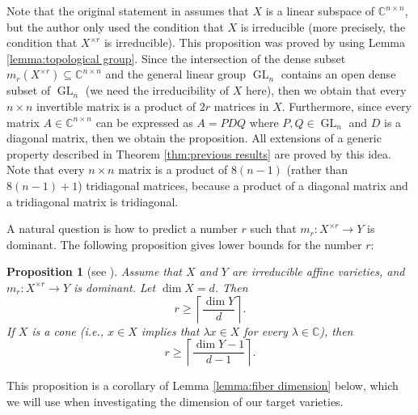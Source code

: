 \documentclass[reqno]{amsart}
\newtheorem{proposition}[theorem]{Proposition}
\theoremstyle{definition}
\numberwithin{equation}{section}
\begin{document}
Note that the original statement in \cite[Proposition 3.10]{ye2017new} assumes that $X$ is a linear subspace of $\mathbb{C}^{n \times n}$, but the author only used the condition that $X$ is irreducible (more precisely, the condition that $X^{\times r}$ is irreducible). This proposition was proved by using Lemma \ref{lemma:topological group}. Since the intersection of the dense subset $m_r(X^{\times r})\subseteq \mathbb{C}^{n \times n}$ and the general linear group $\operatorname{GL}_n$ contains an open dense subset of $\operatorname{GL}_n$ (we need the irreducibility of $X$ here), then we obtain that every $n \times n$ invertible matrix is a product of $2r$ matrices in $X$. Furthermore, since every matrix $A \in \mathbb{C}^{n \times n}$ can be expressed as $A=PDQ$ where $P,Q \in \operatorname{GL}_n$ and $D$ is a diagonal matrix, then we obtain the proposition. All extensions of a generic property described in Theorem \ref{thm:previous results} are proved by this idea. Note that every $n \times n$ matrix is a product of $8(n-1)$ (rather than $8(n-1)+1$) tridiagonal matrices, because a product of a diagonal matrix and a tridiagonal matrix is tridiagonal.

A natural question is how to predict a number $r$ such that $m_r:X^{\times r} \rightarrow Y$ is dominant. The following proposition gives lower bounds for the number $r$:

\begin{proposition}[see {\cite[Corollary 3.4 and Corollary 3.6]{ye2017new}}]\label{prop:lower bound of generic length}
    Assume that $X$ and $Y$ are irreducible affine varieties, and $m_r:X^{\times r} \rightarrow Y$ is dominant. Let $\dim X=d$. Then
    \begin{equation*}
        r \geq \left\lceil \frac{\dim Y}{d} \right\rceil.
    \end{equation*}
    If $X$ is a cone (i.e., $x \in X$ implies that $\lambda x \in X$ for every $\lambda \in \mathbb{C}$), then
    \begin{equation*}
        r \geq \left\lceil \frac{\dim Y-1}{d-1} \right\rceil.
    \end{equation*}
\end{proposition}

This proposition is a corollary of Lemma \ref{lemma:fiber dimension} below, which we will use when investigating the dimension of our target varieties.
\end{document}
